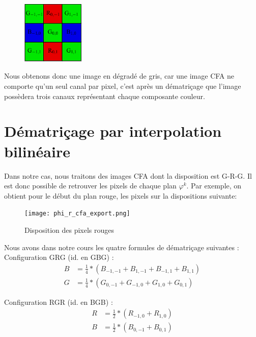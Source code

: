\documentclass[a4paper,11pt]{article}
\begin{document}
  \begin{figure}[H]
  \center
   \includegraphics[width=3cm]{bayerBGB.png}
  \end{figure}
  
  Nous obtenons donc une image en dégradé de gris, car une image CFA ne comporte qu'un seul canal par pixel,
  c'est après un dématriçage que l'image possèdera trois canaux représentant chaque composante couleur.
  
  \section{Dématriçage par interpolation bilinéaire}
  
  Dans notre cas, nous traitons des images CFA dont la disposition est G-R-G. Il est donc possible de 
  retrouver les pixels de chaque plan $\varphi^k$. Par exemple, on obtient pour le début du plan rouge, 
  les pixels sur la dispositions suivante:
  
  \begin{figure}[H]
   \center
   \texttt{[image: phi\_r\_cfa\_export.png]}
   \caption{Disposition des pixels rouges}
  \end{figure}
  
  Nous avons dans notre cours les quatre formules de dématriçage suivantes :\\
  
  Configuration {GRG} (id. en {GBG}) :\\
  \begin{align}
  B &= \frac{1}{4} * (B_{-1,-1}+B_{1,-1}+B_{-1,1}+B_{1,1})\\
  G &= \frac{1}{4} * (G_{0,-1}+G_{-1,0}+G_{1,0}+G_{0,1})
  \end{align}
  
  Configuration {RGR} (id. en {BGB}) :\\
  \begin{align}
  R &= \frac{1}{2} * (R_{-1,0}+R_{1,0})\\
  B &= \frac{1}{2} * (B_{0,-1}+B_{0,1})
  \end{align}
  
\end{document}
